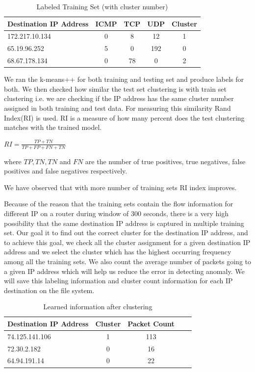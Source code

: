 \documentclass[10pt,oneside,a4paper]{article}
\begin{document}
\begin{table}[H]
\centering
  \begin{tabular}{| l | c | c | c | c |}
    \hline
    {Destination IP Address}  &ICMP  &TCP &UDP  &Cluster \\
    \hline
    172.217.10.134  & 0     & 8     & 12  &1  \\ \hline
    65.19.96.252    & 5     & 0     & 192 &0  \\ \hline
    68.67.178.134   & 0     & 78    & 0   &2  \\ \hline
  \end{tabular}
\caption{Labeled Training Set (with cluster number)} \label{table:labeled-set}
\end{table}


We ran the k-means++ for both training and testing set and produce labels for both. We then checked how similar the test set clustering is with train set clustering i.e. we are checking if the IP address has the same cluster number assigned in both training and test data. For measuring this similarity Rand Index(RI)\cite{ri-index} is used. RI is a measure of how many percent does the test clustering matches with the trained model.

\hspace{4cm} $RI={\frac {TP+TN}{TP+FP+FN+TN}}$

where $TP, TN, TN$ and $FN$ are the number of true positives, true negatives, false positives and false negatives respectively.

We have observed that with more number of training sets RI index improves.

Because of the reason that the training sets contain the flow information for different IP on a router during window of 300 seconds, there is a very high possibility that the same destination IP address is captured in multiple training set. Our goal it to find out the correct cluster for the destination IP address, and to achieve this goal, we check all the cluster assignment for a given destination IP address and we select the cluster which has the highest occurring frequency among all the training sets. We also count the average number of packets going to a given IP address which will help us reduce the error in detecting anomaly. We will save this labeling information and cluster count information for each IP destination on the file system.

\begin{table}[H]
\centering
  \begin{tabular}{| l | c | c | c | c |}
    \hline
    {Destination IP Address}  &Cluster  &Packet Count \\
    \hline
    74.125.141.106  & 1     & 113  \\ \hline
    72.30.2.182     & 0     & 16   \\ \hline
    64.94.191.14    & 0     & 22   \\ \hline
  \end{tabular}
\caption{Learned information after clustering} \label{table:learned-clustering}
\end{table}
\end{document}
